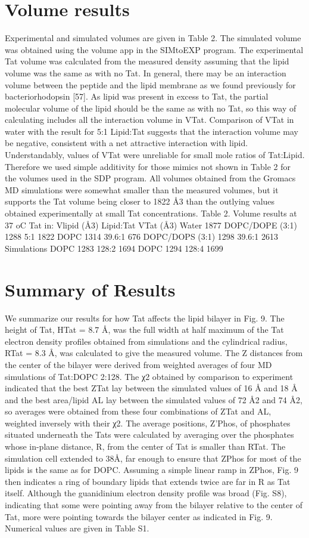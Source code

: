 \section{Volume results}
Experimental and simulated volumes are given in Table 2. The simulated volume was
obtained using the volume app in the SIMtoEXP program. The experimental Tat volume was
calculated from the measured density assuming that the lipid volume was the same as with no
Tat. In general, there may be an interaction volume between the peptide and the lipid membrane
as we found previously for bacteriorhodopsin [57]. As lipid was present in excess to Tat, the
partial molecular volume of the lipid should be the same as with no Tat, so this way of
calculating includes all the interaction volume in VTat. Comparison of VTat in water with the
result for 5:1 Lipid:Tat suggests that the interaction volume may be negative, consistent with a
net attractive interaction with lipid. Understandably, values of VTat were unreliable for small
mole ratios of Tat:Lipid. Therefore we used simple additivity for those mimics not shown in
Table 2 for the volumes used in the SDP program. All volumes obtained from the Gromacs MD
simulations were somewhat smaller than the measured volumes, but it supports the Tat volume
being closer to 1822 Å3 than the outlying values obtained experimentally at small Tat
concentrations.
Table 2. Volume results at 37 oC
Tat in: Vlipid (Å3) Lipid:Tat VTat (Å3)
Water 1877
DOPC/DOPE (3:1) 1288 5:1 1822
DOPC 1314 39.6:1 676
DOPC/DOPS (3:1) 1298 39.6:1 2613
Simulations
DOPC 1283 128:2 1694
DOPC 1294 128:4 1699

\section{Summary of Results}
We summarize our results for how Tat affects the lipid bilayer in Fig. 9. The height of
Tat, HTat = 8.7 Å, was the full width at half maximum of the Tat electron density profiles
obtained from simulations and the cylindrical radius, RTat = 8.3 Å, was calculated to give the
measured volume. The Z distances from the center of the bilayer were derived from weighted
averages of four MD simulations of Tat:DOPC 2:128. The χ2 obtained by comparison to
experiment indicated that the best ZTat lay between the simulated values of 16 Å and 18 Å and
the best area/lipid AL lay between the simulated values of 72 Å2 and 74 Å2, so averages were
obtained from these four combinations of ZTat and AL, weighted inversely with their χ2. The
average positions, Z'Phos, of phosphates situated underneath the Tats were calculated by
averaging over the phosphates whose in-plane distance, R, from the center of Tat is smaller than
RTat. The simulation cell extended to 38Å, far enough to ensure that ZPhos for most of the lipids is
the same as for DOPC. Assuming a simple linear ramp in ZPhos, Fig. 9 then indicates a ring of
boundary lipids that extends twice are far in R as Tat itself. Although the guanidinium electron
density profile was broad (Fig. S8), indicating that some were pointing away from the bilayer
relative to the center of Tat, more were pointing towards the bilayer center as indicated in Fig. 9.
Numerical values are given in Table S1.

